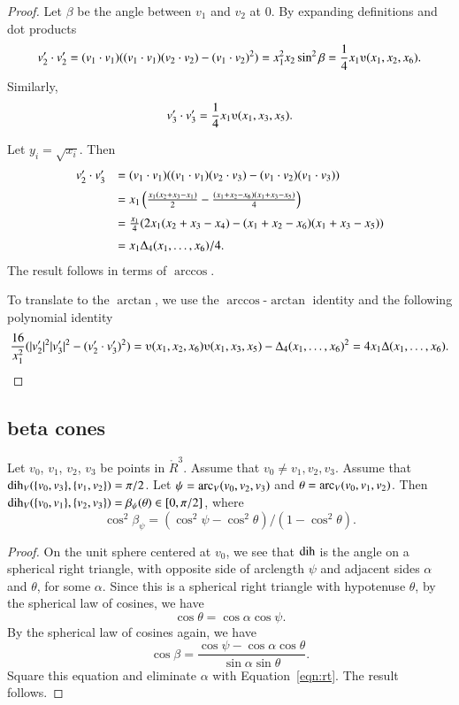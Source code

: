 \begin{proof}
Let $\beta$ be the angle between $v_1$ and $v_2$ at $0$.
    By expanding definitions and dot products
    $$
    v'_2\cdot v'_2 = (v_1\cdot v_1) ((v_1\cdot v_1)(v_2\cdot v_2) -
    (v_1\cdot v_2)^2) =  x_1^2 x_2 \sin^2 \beta = \frac{1}{4}
    x_1
    \ups(x_1,x_2,x_6).
    $$
    Similarly,
    $$v'_3 \cdot v'_3 = \frac{1}{4} x_1 \ups(x_1,x_3,x_5).$$

Let $y_i = \sqrt{x_i}$. Then
    $$\begin{array}{lll}
    v'_2\cdot v'_3 &= (v_1\cdot v_1)((v_1\cdot v_1)(v_2\cdot v_3) -
    (v_1\cdot v_2)(v_1\cdot v_3) ) \vspace{6pt} \\  &
    = x_1 \left(\frac{ x_1 (x_2 + x_3 -
    x_1)}{2} - \frac{(x_1 + x_2 - x_6)(x_1 + x_3 -
    x_5)}{4} \right)\vspace{6pt}\\&
    = \frac{x_1}{4} (2 x_1 (x_2+x_3-x_4) -
    (x_1+x_2-x_6)(x_1+x_3-x_5)) \vspace{6pt}\\&
    = {x_1\Delta_4(x_1,\ldots,x_6)}/{4}.
    \end{array}
    $$
The result follows in terms of $\arccos$.

To translate to the $\arctan$, 
we use the $\arccos$-$\arctan$ identity
and the following polynomial identity
    $$
    \frac{16}{x_1^2}(|v'_2|^2 |v'_3|^2 - (v'_2\cdot v'_3)^2) =
    \ups(x_1,x_2,x_6)\ups(x_1,x_3,x_5) - \Delta_4(x_1,\ldots,x_6)^2
    = 4 x_1 \Delta(x_1,\ldots,x_6).
    $$
\end{proof}


\subsection{beta cones }


\begin{lemma}\label{lemma:beta-cone}
Let $v_0$, $v_1$, $v_2$, $v_3$ be points in $\ring{R}^3$.   
Assume that $v_0\ne v_1,v_2,v_3$.  Assume
that $\operatorname{dih}_V(\{v_0,v_3\},\{v_1,v_2\})=\pi/2$.  Let
$\psi = \operatorname{arc}_V(v_0,v_2,v_3)$ and $\theta=\operatorname{arc}_V(v_0,v_1,v_2)$. 
Then $\operatorname{dih}_V(\{v_0,v_1\},\{v_2,v_3\}) = \beta_\psi(\theta)\in[0,\pi/2]$,
where
  $$
      \cos^2\beta_\psi = (\cos^2\psi-\cos^2\theta)/(1-\cos^2\theta).
  $$
\end{lemma}

\begin{proof}  On the unit sphere centered at $v_0$, we see that
$\operatorname{dih}$ is the angle on a spherical right triangle,
with opposite side of arclength $\psi$ and adjacent sides $\alpha$
and $\theta$, for some $\alpha$. 
 Since this is a spherical right triangle with hypotenuse
$\theta$, by the spherical law of cosines, we have
   \begin{equation}\label{eqn:rt}
     \cos\theta = \cos\alpha \cos\psi.
     \end{equation}
By the spherical law of cosines again, we have
    $$
    \cos\beta = \frac{\cos\psi - \cos\alpha\cos\theta}{\sin\alpha\sin\theta}.
    $$
Square this equation and eliminate $\alpha$ with Equation~\ref{eqn:rt}.
The result follows.
\end{proof}




